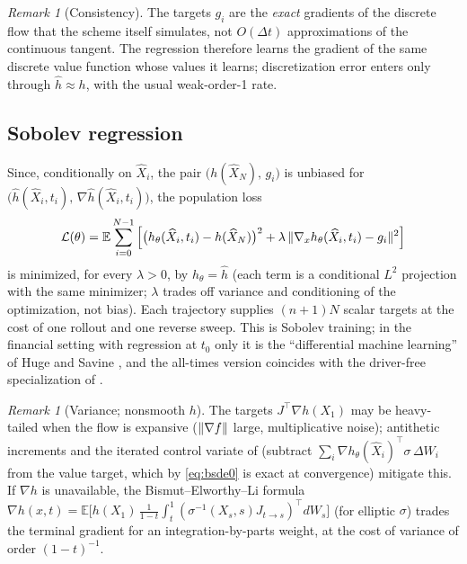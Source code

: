 \documentclass[11pt]{article}
\theoremstyle{definition}
\theoremstyle{remark}
\newtheorem{remark}[theorem]{Remark}
\newcommand{\E}{\mathbb{E}}
\newcommand{\grad}{\nabla}
\DeclarePairedDelimiter{\norm}{\lVert}{\rVert}
\begin{document}
\begin{remark}[Consistency]
The targets $g_i$ are the \emph{exact} gradients of the discrete flow that the scheme itself
simulates, not $O(\Delta t)$ approximations of the continuous tangent. The regression
therefore learns the gradient of the same discrete value function whose values it learns;
discretization error enters only through $\widehat h \approx h$, with the usual weak-order-1
rate.
\end{remark}

\subsection{Sobolev regression}\label{sec:sobolev}

Since, conditionally on $\widehat X_i$, the pair $\big(h(\widehat X_N),\,g_i\big)$ is
unbiased for $\big(\widehat h(\widehat X_i,t_i),\,\grad \widehat h(\widehat X_i,t_i)\big)$,
the population loss
\begin{equation}\label{eq:sobolevloss}
\mathcal L(\theta) = \E\sum_{i=0}^{N-1}
\Big[\big(h_\theta(\widehat X_i,t_i) - h(\widehat X_N)\big)^2
+ \lambda\,\norm{\grad_x h_\theta(\widehat X_i,t_i) - g_i}^2\Big]
\end{equation}
is minimized, for every $\lambda>0$, by $h_\theta = \widehat h$ (each term is a conditional
$L^2$ projection with the same minimizer; $\lambda$ trades off variance and conditioning of
the optimization, not bias). Each trajectory supplies $(n+1)N$ scalar targets at the cost of
one rollout and one reverse sweep. This is Sobolev training; in the financial setting with
regression at $t_0$ only it is the ``differential machine learning'' of Huge and Savine
\cite{HugeSavine}, and the all-times version coincides with the driver-free specialization of
\cite{OSM}.

\begin{remark}[Variance; nonsmooth $h$]\label{rem:variance0}
The targets $J^\top\grad h(X_1)$ may be heavy-tailed when the flow is expansive
($\norm{\grad f}$ large, multiplicative noise); antithetic increments and the iterated
control variate of \cite{Vidales} (subtract
$\sum_i \grad h_\theta(\widehat X_i)^\top \sigma\,\Delta W_i$ from the value target, which by
\eqref{eq:bsde0} is exact at convergence) mitigate this. If $\grad h$ is unavailable, the
Bismut--Elworthy--Li formula \cite{ElworthyLi}
$\grad h(x,t) = \E\big[h(X_1)\,\tfrac1{1-t}\int_t^1 (\sigma^{-1}(X_s,s)J_{t\to s})^\top
dW_s\big]$ (for elliptic $\sigma$) trades the terminal gradient for an integration-by-parts
weight, at the cost of variance of order $(1-t)^{-1}$.
\end{remark}
\end{document}
